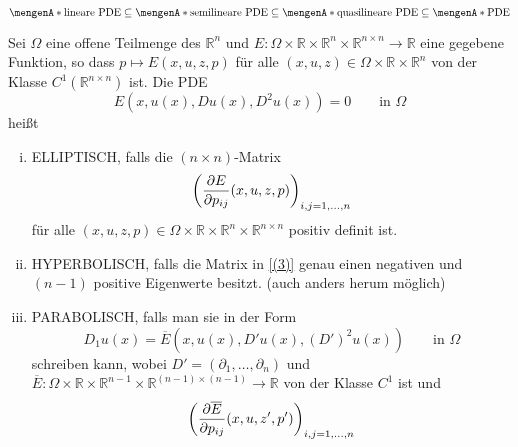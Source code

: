 \begin{bemerkung}
	\[
		\set{\text{lineare PDE}} \subseteq \set{\text{semilineare PDE}} \subseteq \set{\text{quasilineare PDE}} \subseteq \set{\text{PDE}}
	\]
\end{bemerkung}

\begin{definition}
		Sei $\Omega$ eine offene Teilmenge des $\mathbb{R}^n$ und $E: \Omega \times \mathbb{R} \times \mathbb{R}^n \times \mathbb{R}^{n \times n} \to \mathbb{R}$ eine gegebene Funktion, so dass $p \mapsto E(x,u,z,p)$ für alle $(x,u,z) \in \Omega \times \mathbb{R}\times \mathbb{R}^n$ von der Klasse $C^1(\mathbb{R}^{n \times n})$ ist. Die PDE
		\begin{equation}
			E(x,u(x),Du(x),D^2u(x))=0 \qquad \text{in }\Omega 
		\end{equation}
		heißt
		\begin{enumerate}[(i)]
			\item ELLIPTISCH, falls die $(n \times n)$-Matrix 
			\begin{equation}
				\left( \frac{{\partial E}}{{\partial p_{ij}}} (x,u,z,p) \right)_{i,j=1,\dots,n} \label{(3)}
			\end{equation}
			für alle $(x,u,z,p) \in \Omega \times \mathbb{R} \times \mathbb{R}^n \times \mathbb{R}^{n \times n}$ positiv definit ist.
			\item HYPERBOLISCH, falls die Matrix in \eqref{(3)} genau einen negativen und $(n-1)$ positive Eigenwerte besitzt. (auch anders herum möglich)
			\item PARABOLISCH, falls man sie in der Form
			\begin{equation}
				D_1u(x)= \overline{E}(x,u(x),D'u(x),(D')^2u(x)) \qquad \text{in } \Omega
			\end{equation}
			schreiben kann, wobei $D'=(\partial_1,\dots,\partial_n)$ und $\overline{E}: \Omega \times \mathbb{R} \times \mathbb{R}^{n-1} \times \mathbb{R}^{(n-1) \times (n-1)} \to \mathbb{R}$
			von der Klasse $C^1$ ist und 
			\begin{equation}
				\left( \frac{{\partial \overline{E}}}{{\partial p_{ij}}} (x,u,z',p') \right)_{i,j=1,\dots,n} 
			\end{equation}
		\end{enumerate}
\end{definition}

